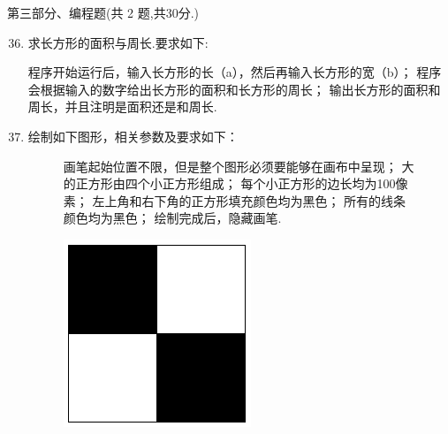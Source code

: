 \documentclass[11pt]{ctexart}
\begin{document}
    {\noindent\heiti 第三部分、编程题(共 2 题,共30分.)}
    \begin{enumerate}
        \setcounter{enumi}{35}
        
        \item 求长方形的面积与周长.要求如下:
        \begin{tasks}[label=(\arabic*)]
            \task 程序开始运行后，输入长方形的长（a），然后再输入长方形的宽（b）；
            \task 程序会根据输入的数字给出长方形的面积和长方形的周长；
            \task 输出长方形的面积和周长，并且注明是面积还是和周长.
        \end{tasks}
        \vfill

        \item 绘制如下图形，相关参数及要求如下：
        
        \begin{figure}[htbp]
            \begin{minipage}{.6\textwidth}
                \begin{tasks}[label=(\arabic*)]
                    \task 画笔起始位置不限，但是整个图形必须要能够在画布中呈现；
                    \task 大的正方形由四个小正方形组成；
                    \task 每个小正方形的边长均为100像素；
                    \task 左上角和右下角的正方形填充颜色均为黑色；
                    \task 所有的线条颜色均为黑色；
                    \task 绘制完成后，隐藏画笔.
                \end{tasks}
            \end{minipage}
            \begin{minipage}{.35\textwidth}
                \centering
                \includegraphics[width=.6\textwidth]{37.png}
            \end{minipage}
        \end{figure}
        
        \vfill
    \end{enumerate}
\end{document}
